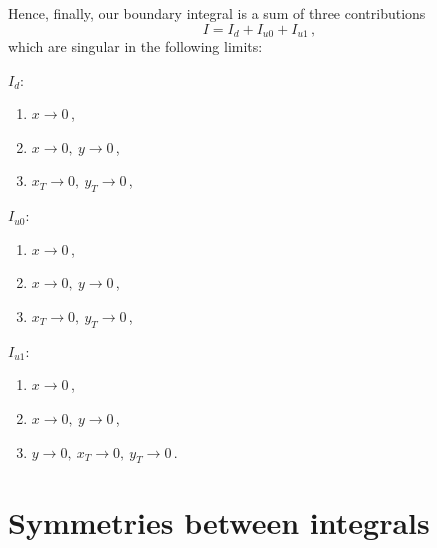 \documentclass[a4paper,11pt]{report}
\numberwithin{equation}{section}
\begin{document}
Hence, finally, our boundary integral is a sum of three contributions
%
\begin{equation}
  I = I_d + I_{u0} + I_{u1}\,,
\end{equation}
%
which are singular in the following limits: \vspace{10pt}

\noindent
$I_d$:
%
\begin{enumerate}
  \item
  $x \to 0$\,,
  \vspace{-5pt}
  \item
  $x \to 0,\ y \to 0$\,,
  \vspace{-5pt}
  \item
   $ x_T \to 0,\  y_T \to 0$\,,
\end{enumerate}

\noindent
$I_{u0}$:
%
\begin{enumerate}
  \item
  $x \to 0$\,,
  \vspace{-5pt}
  \item
  $x \to 0,\ y \to 0$\,,
  \vspace{-5pt}
  \item
   $ x_T \to 0,\  y_T \to 0$\,,
\end{enumerate}

\noindent
$I_{u1}$:
%
\begin{enumerate}
  \item
  $x \to 0$\,,
  \vspace{-5pt}
  \item
  $x \to 0,\ y \to 0$\,,
  \vspace{-5pt}
  \item
   $y \to 0,\ x_T \to 0,\ y_T \to 0$\,.
\end{enumerate}

\section{Symmetries between integrals}
\end{document}
